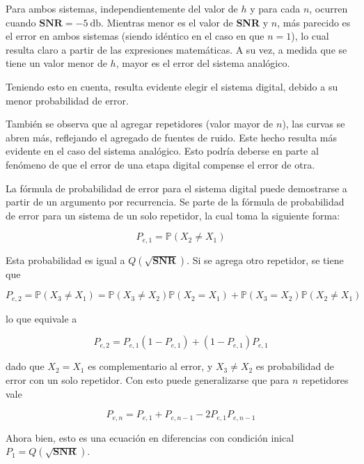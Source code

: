 Para ambos sistemas, independientemente del valor de $h$ y para cada $n$, ocurren cuando $\textbf{SNR}=\SI{-5}{\decibel}$. Mientras menor es el valor de \textbf{SNR} y $n$, más parecido es el error en ambos sistemas (siendo idéntico en el caso en que $n=1$), lo cual resulta claro a partir de las expresiones matemáticas. A su vez, a medida que se tiene un valor menor de $h$, mayor es el error del sistema analógico. 

Teniendo esto en cuenta, resulta evidente elegir el sistema digital, debido a su menor probabilidad de error.

También se observa que al agregar repetidores (valor mayor de $n$), las curvas se abren más, reflejando el agregado de fuentes de ruido. Este hecho resulta más evidente en el caso del sistema analógico. Esto podría deberse en parte al fenómeno de que el error de una etapa digital compense el error de otra. 

La fórmula de probabilidad de error para el sistema digital puede demostrarse a partir de un argumento por recurrencia. Se parte de la fórmula de probabilidad de error para un sistema de un solo repetidor, la cual toma la siguiente forma:

\begin{equation}
P_{e,1}=\mathbb{P}(X_2\neq X_1) 
\end{equation} 

Esta probabilidad es igual a $Q(\sqrt{\textbf{SNR}})$. Si se agrega otro repetidor, se tiene que

\begin{equation}
P_{e,2}=\mathbb{P}(X_3\neq X_1)=\mathbb{P}(X_3\neq X_2)\mathbb{P}(X_2 = X_1)+\mathbb{P}(X_3 = X_2)\mathbb{P}(X_2\neq X_1)
\end{equation} 

lo que equivale a 

\begin{equation}
P_{e,2}=P_{e,1}(1-P_{e,1})+(1-P_{e,1})P_{e,1}
\end{equation} 

dado que $X_2 = X_1$ es complementario al error, y $X_3 \neq X_2$ es probabilidad de error con un solo repetidor. Con esto puede generalizarse que para $n$ repetidores vale

\begin{equation}
P_{e,n}=P_{e,1}+P_{e,n-1}-2P_{e,1}P_{e,n-1}
\end{equation} 

Ahora bien, esto es una ecuación en diferencias con condición inical $P_1 = Q(\sqrt{\textbf{SNR}})$. 

